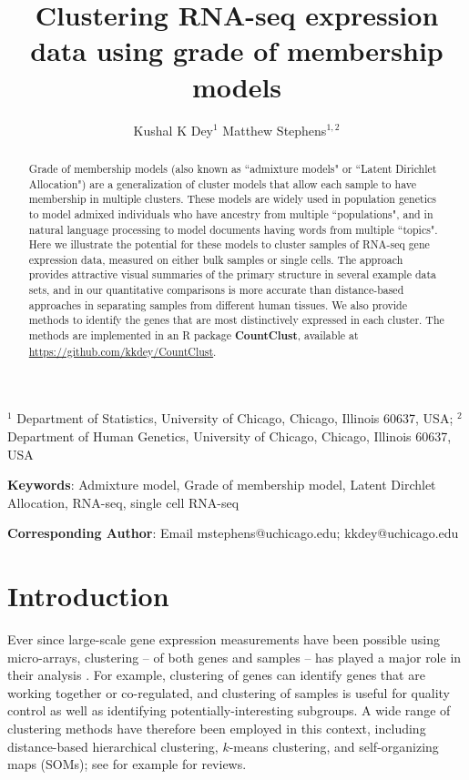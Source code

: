 \title{\Large{\textbf{Clustering RNA-seq expression data using grade of membership models}}}
\author{ Kushal K Dey$^{1}$  \qquad Matthew Stephens$^{1,2}$}

\maketitle

$^{1}$ Department of Statistics, University of Chicago, Chicago, Illinois 60637, USA;  $^{2}$ Department of Human Genetics, University of Chicago, Chicago, Illinois 60637, USA

\textbf{Keywords}: Admixture model, Grade of membership model, Latent Dirchlet Allocation, RNA-seq, single cell RNA-seq

\textbf{Corresponding Author}: Email mstephens@uchicago.edu; kkdey@uchicago.edu 
					      


\newpage

\begin{abstract}
Grade of membership models (also known as ``admixture models" or ``Latent Dirichlet Allocation") 
are a generalization of cluster models that allow each sample to have membership in multiple clusters.
These models are widely used in population genetics to model admixed individuals who have ancestry from multiple ``populations", 
and in natural language processing to model documents having words from multiple ``topics". Here we illustrate the potential for these models
to cluster samples of RNA-seq gene expression data, measured on either bulk samples or single cells. The approach provides 
attractive visual summaries of the primary structure in several example data sets, and in our quantitative comparisons is more accurate
than distance-based approaches in separating samples from different human tissues. We also provide methods to identify the genes that are most distinctively expressed in each cluster. The methods are implemented in an R package \textbf{CountClust}, available at \url{https://github.com/kkdey/CountClust}.
\end{abstract}

\section{Introduction}

Ever since large-scale gene expression measurements have been possible using micro-arrays, clustering -- of both genes and samples -- 
has played a major role in their analysis \cite{Eisen1998,Golub1999,Alizadeh2000}.
For example, clustering of genes can identify genes that are working together or co-regulated, and clustering of samples is useful for quality control 
as well as identifying potentially-interesting subgroups. A wide range of clustering methods have therefore
been employed in this context, including distance-based hierarchical clustering, $k$-means clustering, and self-organizing maps (SOMs); see for example \cite{Dhaeseleer2005,Jiang2004} for reviews. 

